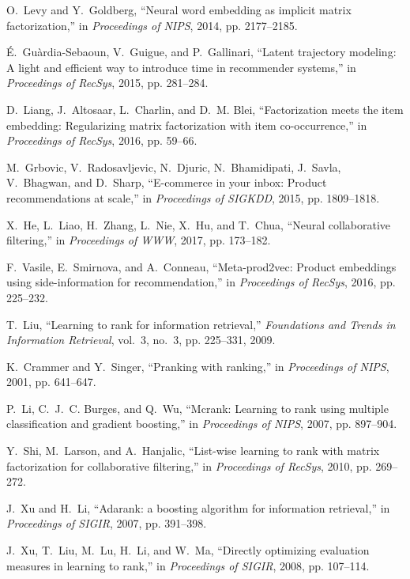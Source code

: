 \documentclass[10pt,journal,compsoc]{IEEEtran}
\begin{document}
\begin{sloppypar}
\begin{thebibliography}{10}
O.~Levy and Y.~Goldberg, ``Neural word embedding as implicit matrix
  factorization,'' in \emph{Proceedings of NIPS}, 2014, pp. 2177--2185.

{\'{E}}.~Gu{\`{a}}rdia{-}Sebaoun, V.~Guigue, and P.~Gallinari, ``Latent
  trajectory modeling: {A} light and efficient way to introduce time in
  recommender systems,'' in \emph{Proceedings of RecSys}, 2015, pp. 281--284.

D.~Liang, J.~Altosaar, L.~Charlin, and D.~M. Blei, ``Factorization meets the
  item embedding: Regularizing matrix factorization with item co-occurrence,''
  in \emph{Proceedings of RecSys}, 2016, pp. 59--66.

M.~Grbovic, V.~Radosavljevic, N.~Djuric, N.~Bhamidipati, J.~Savla, V.~Bhagwan,
  and D.~Sharp, ``E-commerce in your inbox: Product recommendations at scale,''
  in \emph{Proceedings of {SIGKDD}}, 2015, pp. 1809--1818.

X.~He, L.~Liao, H.~Zhang, L.~Nie, X.~Hu, and T.~Chua, ``Neural collaborative
  filtering,'' in \emph{Proceedings of {WWW}}, 2017, pp. 173--182.

F.~Vasile, E.~Smirnova, and A.~Conneau, ``Meta-prod2vec: Product embeddings
  using side-information for recommendation,'' in \emph{Proceedings of RecSys},
  2016, pp. 225--232.

T.~Liu, ``Learning to rank for information retrieval,'' \emph{Foundations and
  Trends in Information Retrieval}, vol.~3, no.~3, pp. 225--331, 2009.

K.~Crammer and Y.~Singer, ``Pranking with ranking,'' in \emph{Proceedings of
  NIPS}, 2001, pp. 641--647.

P.~Li, C.~J.~C. Burges, and Q.~Wu, ``Mcrank: Learning to rank using multiple
  classification and gradient boosting,'' in \emph{Proceedings of NIPS}, 2007,
  pp. 897--904.

Y.~Shi, M.~Larson, and A.~Hanjalic, ``List-wise learning to rank with matrix
  factorization for collaborative filtering,'' in \emph{Proceedings of RecSys},
  2010, pp. 269--272.

J.~Xu and H.~Li, ``Adarank: a boosting algorithm for information retrieval,''
  in \emph{Proceedings of {SIGIR}}, 2007, pp. 391--398.

J.~Xu, T.~Liu, M.~Lu, H.~Li, and W.~Ma, ``Directly optimizing evaluation
  measures in learning to rank,'' in \emph{Proceedings of {SIGIR}}, 2008, pp.
  107--114.


\end{thebibliography}
\end{sloppypar}
\end{document}
